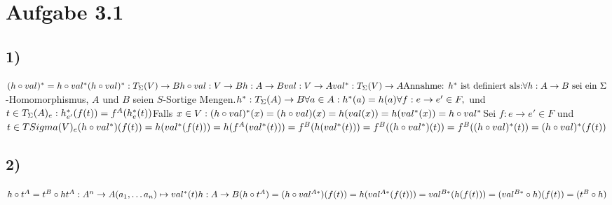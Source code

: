 \section*{Aufgabe 3.1}
\subsection*{1)}
$(h \circ val)^* = h \circ val^*\\
\\
(h \circ val)^* : T_{\Sigma}(V) \rightarrow B\\
h \circ val : V \rightarrow B\\
h : A \rightarrow B\\
val : V \rightarrow A\\
val^* : T_\Sigma(V) \rightarrow A\\
\\
\text{Annahme: } h^* \text{ ist definiert als:}\\
\forall h : A \rightarrow B \text{ sei ein } \Sigma$-Homomorphismus, $A$ und $B$ seien $S$-Sortige Mengen.$\\
h^* : T_\Sigma(A) \rightarrow B\\
\forall a\in A: h^*(a) = h(a)\\
\forall f: e \rightarrow e' \in F, $ und $ t \in T_\Sigma(A)_e: h_{e'}^*(f(t)) = f^A(h_e^*(t))\\
\\
$Falls $ x\in V:\\
(h\circ val)^*(x) = (h\circ val)(x) = h(val(x)) = h(val^*(x)) = h\circ val^* \\
$Sei $f:e\rightarrow e' \in F$ und $t\in T\\Sigma(V)_e\\
(h\circ val^*)(f(t))=h(val^*(f(t)))=h(f^A(val^*(t)))=f^B(h(val^*(t)))=f^B((h\circ val^*)(t)) = f^B((h\circ val)^*(t)) =(h\circ val)^*(f(t))$
\subsection*{2)}
$h\circ t^A = t^B \circ h\\
t^A:A^n\rightarrow A\\
(a_1,\dots a_n) \mapsto val^*(t)\\
h:A\rightarrow B\\
(h\circ t^A) = (h\circ val^{A*})(f(t)) = h(val^{A*}(f(t))) = val^{B*}(h(f(t))) = (val^{B*} \circ h)(f(t))=(t^B\circ h)$

